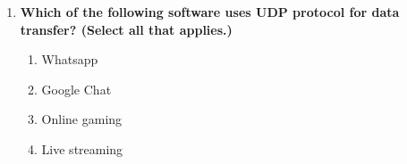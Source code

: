 \begin{flushleft}
\begin{enumerate}
		\item \textbf{Which of the following software uses UDP protocol for data transfer? (Select all that applies.)}
		\begin{enumerate}[label=(\alph*)]
			\item Whatsapp 
			\item Google Chat
			\item Online gaming   %
			\item Live streaming  %
		\end{enumerate}
		
	\end{enumerate}
\end{flushleft}

\newpage


